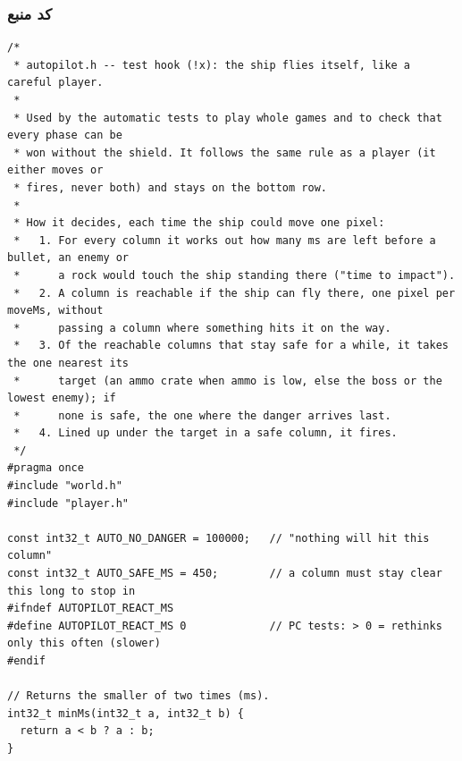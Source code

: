 \documentclass[11pt,a4paper]{article}
\begin{document}
\subsubsection*{کد منبع}
\begin{latin}
\begin{lstlisting}[language=Arduino]
/*
 * autopilot.h -- test hook (!x): the ship flies itself, like a careful player.
 *
 * Used by the automatic tests to play whole games and to check that every phase can be
 * won without the shield. It follows the same rule as a player (it either moves or
 * fires, never both) and stays on the bottom row.
 *
 * How it decides, each time the ship could move one pixel:
 *   1. For every column it works out how many ms are left before a bullet, an enemy or
 *      a rock would touch the ship standing there ("time to impact").
 *   2. A column is reachable if the ship can fly there, one pixel per moveMs, without
 *      passing a column where something hits it on the way.
 *   3. Of the reachable columns that stay safe for a while, it takes the one nearest its
 *      target (an ammo crate when ammo is low, else the boss or the lowest enemy); if
 *      none is safe, the one where the danger arrives last.
 *   4. Lined up under the target in a safe column, it fires.
 */
#pragma once
#include "world.h"
#include "player.h"

const int32_t AUTO_NO_DANGER = 100000;   // "nothing will hit this column"
const int32_t AUTO_SAFE_MS = 450;        // a column must stay clear this long to stop in
#ifndef AUTOPILOT_REACT_MS
#define AUTOPILOT_REACT_MS 0             // PC tests: > 0 = rethinks only this often (slower)
#endif

// Returns the smaller of two times (ms).
int32_t minMs(int32_t a, int32_t b) {
  return a < b ? a : b;
}


\end{lstlisting}
\end{latin}
\end{document}

